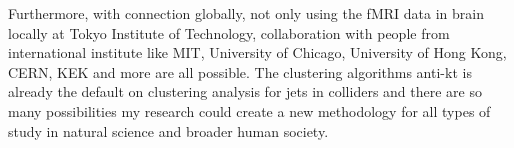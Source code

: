 \documentclass{article}
\begin{document}
Furthermore, with connection globally, not only using the fMRI data in brain locally 
at Tokyo Institute of Technology, collaboration with people from international 
institute like MIT, University of Chicago, University of Hong Kong, CERN, KEK and 
more are all possible. The clustering algorithms anti-kt is already the 
default on clustering analysis for jets in colliders and there are so 
many possibilities my research could create a new methodology for 
all types of study in natural science and broader human society. 



\end{document}
